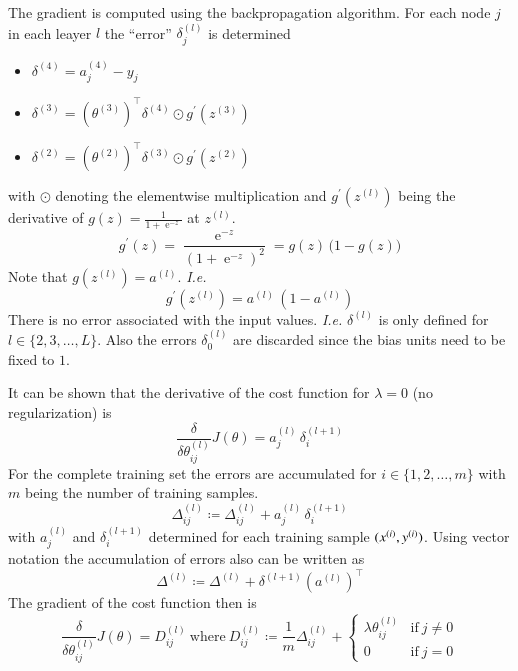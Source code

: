 \documentclass[a4paper,twoside,10pt]{article}
\begin{document}
The gradient is computed using the backpropagation algorithm.
For each node $j$ in each leayer $l$ the ``error'' $\delta^{(l)}_j$ is determined
\begin{itemize}
  \item $\delta^{(4)}=a^{(4)}_j-y_j$
  \item $\delta^{(3)}=(\theta^{(3)})^\top\delta^{(4)}\odot g^\prime(z^{(3)})$
  \item $\delta^{(2)}=(\theta^{(2)})^\top\delta^{(3)}\odot g^\prime(z^{(2)})$
\end{itemize}
with $\odot$ denoting the elementwise multiplication and $g^\prime(z^{(l)})$ being the derivative of $g(z)=\frac{1}{1+\operatorname{e}^{-z}}$ at $z^{(l)}$.
\begin{equation*}
  g^\prime(z)=\frac{\operatorname{e}^{-z}}{(1+\operatorname{e}^{-z})^2}=g(z)\,\big(1-g(z)\big)
\end{equation*}
Note that $g(z^{(l)})=a^{(l)}$. \emph{I.e.}
\begin{equation*}
  g^\prime(z^{(l)})=a^{(l)}\,(1-a^{(l)})
\end{equation*}
There is no error associated with the input values. \emph{I.e.} $\delta^{(l)}$ is only defined for $l\in\{2,3,\ldots,L\}$.
Also the errors $\delta^{(l)}_0$ are discarded since the bias units need to be fixed to $1$.

It can be shown that the derivative of the cost function for $\lambda=0$ (no regularization) is
\begin{equation*}
  \frac{\delta}{\delta\theta^{(l)}_{ij}}J(\theta)=a^{(l)}_j\,\delta^{(l+1)}_i
\end{equation*}
For the complete training set the errors are accumulated for $i\in\{1,2,\ldots,m\}$ with $m$ being the number of training samples.
\begin{equation*}
  \Delta^{(l)}_{ij}\coloneqq\Delta^{(l)}_{ij}+a^{(l)}_j\,\delta^{(l+1)}_i
\end{equation*}
with $a^{(l)}_j$ and $\delta^{(l+1)}_i$ determined for each training sample $(x^{(i)},y^{(i)})$.
Using vector notation the accumulation of errors also can be written as
\begin{equation*}
  \Delta^{(l)}\coloneqq\Delta^{(l)}+\delta^{(l+1)}(a^{(l)})^\top
\end{equation*}
The gradient of the cost function then is
\begin{equation*}
  \frac{\delta}{\delta\theta^{(l)}_{ij}}J(\theta)=D^{(l)}_{ij}\mathrm{\ where\ }
  D^{(l)}_{ij}\coloneqq\frac{1}{m}\Delta^{(l)}_{ij}+\left\{
    \begin{array}{ll}\lambda\theta^{(l)}_{ij}&\mathrm{if\ }j\neq 0\\
  0&\mathrm{if\ }j=0\end{array}\right.
\end{equation*}
\end{document}
